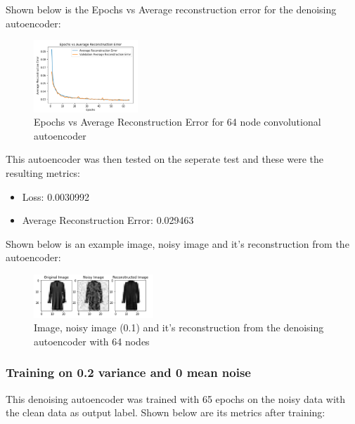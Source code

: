 \documentclass[conference]{IEEEtran}
\begin{document}
    Shown below is the Epochs vs Average reconstruction error for the denoising autoencoder:

    \begin{figure}[H]
        \centering
        \captionsetup{justification=centering}
        \centering
            \includegraphics[width=0.35\textwidth]{35.png}
            \caption{Epochs vs Average Reconstruction Error for 64 node convolutional autoencoder}
    \end{figure}

    This autoencoder was then tested on the seperate test and these were the resulting metrics:

    \begin{itemize}
        \item Loss: 0.0030992
        \item Average Reconstruction Error: 0.029463\\
    \end{itemize}

    Shown below is an example image, noisy image and it's reconstruction from the autoencoder:

    \begin{figure}[H]
        \centering
        \captionsetup{justification=centering}
        \centering
            \includegraphics[width=0.4\textwidth]{36.png}
            \caption{Image, noisy image (0.1) and it's reconstruction from the denoising autoencoder with 64 nodes}
    \end{figure}




    \subsubsection{Training on 0.2 variance and 0 mean noise\\}

    This denoising autoencoder was trained with 65 epochs on the noisy data with the clean data as output label. Shown below
    are its metrics after training: 
\end{document}
